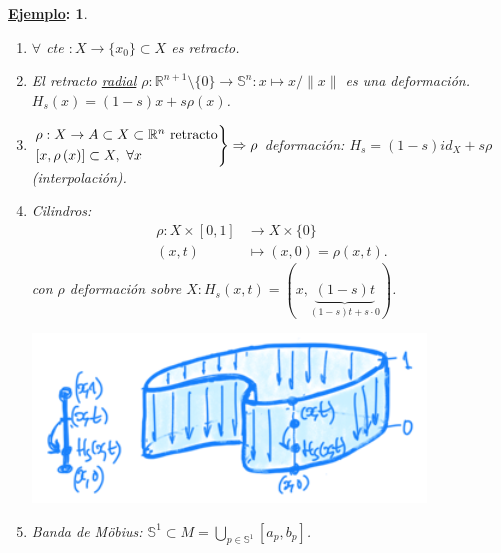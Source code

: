 \documentclass[10pt,a4paper,openright]{book}
\theoremstyle{break}
\newtheorem*{ej}{\underline{Ejemplo}:}
\begin{document}
\begin{ej}
\begin{enumerate}
    \item $\forall$ cte $: X \rightarrow \{x_0\} \subset X$ es retracto.
    \item El retracto \underline{radial} $\rho: \mathbb{R}^{n + 1} \setminus \{0\} \rightarrow \mathbb{S}^n: x \mapsto x / \lVert x \rVert$ es una deformación. $H_s\left( x \right) = \left( 1 - s \right) x + s\rho\left( x \right)$.
    \item $\begin{rcases}
        \rho: X \rightarrow A \subset X \subset \mathbb{R}^n \text{ retracto}\\
        \left[ x, \rho\left( x \right) \right] \subset X,\ \forall x
    \end{rcases} \Rightarrow \rho$ deformación: $H_s = \left( 1 - s \right) id_X + s\rho$ (interpolación).
    \item Cilindros: 
    \begin{align*}
        \rho: X \times \left[ 0, 1 \right] &\rightarrow X \times \{0\}\\
        \left( x, t \right) &\mapsto \left( x, 0 \right) = \rho \left( x, t \right) 
    .\end{align*}
    con $\rho$ deformación sobre $X : H_s\left( x, t \right) = \left( x, \underbrace{\left( 1 - s \right) t}_{\left( 1 - s \right) t + s \cdot 0} \right)$.
    \begin{center}
        \includegraphics[scale=0.3]{images/deformacion_cilindros} 
    \end{center}
    \item Banda de Möbius: $\mathbb{S}^1 \subset M = \bigcup_{p \in \mathbb{S}^1} \left[ a_p, b_p \right]$.


\end{enumerate}
\end{ej}
\end{document}
